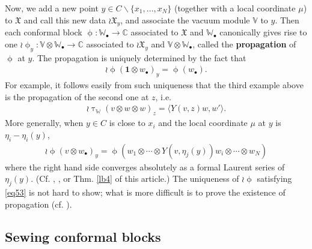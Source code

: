 \documentclass[12pt,a4paper,notitlepage]{article}
\theoremstyle{definition}
\theoremstyle{plain}
\newcommand{\fk}{\mathfrak}
\newcommand{\id}{\mathbf{1}}
\newcommand{\bk}[1]{\langle {#1}\rangle}
\newcommand{\blt}{\bullet}
\newcommand{\Vbb}{\mathbb V}
\newcommand{\Wbb}{\mathbb W}
\newcommand{\Cbb}{\mathbb C}
\numberwithin{equation}{section}
\begin{document}
Now, we add a new point $y\in C\backslash\{x_1,\dots,x_N\}$ (together with a local coordinate $\mu$) to $\fk X$ and call this new data $\wr\fk X_y$, and associate the vacuum module $\Vbb$ to $y$. Then  each conformal block $\upphi:\Wbb_\blt\rightarrow\Cbb$ associated to $\fk X$ and $\Wbb_\blt$ canonically gives rise to one $\wr\upphi_y:\Vbb\otimes\Wbb_\blt\rightarrow\Cbb$ associated to $\wr\fk X_y$ and $\Vbb\otimes\Wbb_\blt$, called the \textbf{propagation} of $\upphi$ at $y$. The propagation is uniquely determined by the fact that
\begin{align}
\wr\upphi(\id\otimes w_\blt)_y=\upphi(w_\blt).\label{eq53}
\end{align}
For example, it follows easily from such uniqueness that the third example above is the propagation of the second one at $z$, i.e.
\begin{align*}
\wr\uptau_\Wbb(v\otimes w\otimes w)_z=	\bk{Y(v,z)w,w'}.
\end{align*} 
More generally, when $y\in C$ is close to $x_i$ and the local coordinate $\mu$ at $y$ is $\eta_i-\eta_i(y)$, 
\begin{align}
\wr\upphi(v\otimes w_\blt)_y=\upphi(w_1\otimes\cdots\otimes Y(v,\eta_j(y))w_i\otimes\cdots\otimes w_N)	\label{eq54}
\end{align}
where the right hand side converges absolutely as a formal Laurent series of $\eta_j(y)$. (Cf. \cite[Thm. 6.2]{Zhu94}, \cite[Chapter 10]{FB04}, or Thm. \ref{lb4} of this article.) The uniqueness of $\wr\upphi$ satisfying \eqref{eq53} is not hard to show; what is more difficult is to prove the existence of propagation (cf. \cite{TUY89,Zhu94,Zhu96,FB04,Cod19,DGT19a}).



\subsection*{Sewing conformal blocks}
\end{document}
